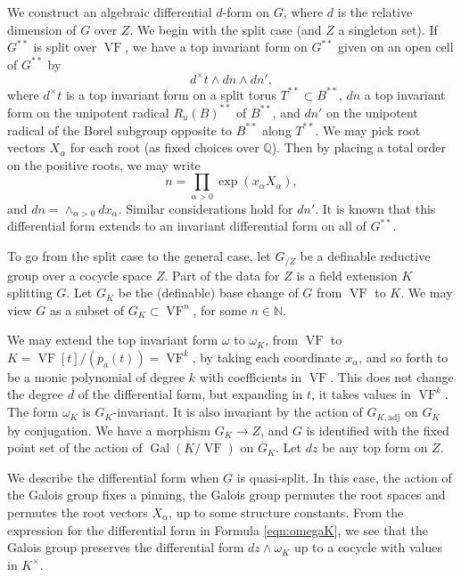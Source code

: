 \documentclass[12pt]{amsart}
\newcommand{\op}[1]{\operatorname{#1}}
\newcommand{\ring}[1]{{\mathbb #1}}
\def\VF{{\op{VF}}}
\theoremstyle{plain}
\theoremstyle{definition}
\begin{document}
We construct an algebraic differential $d$-form on $G$, where $d$ is
the relative dimension of $G$ over $Z$.  We begin with the split case
(and $Z$ a singleton set).  If $G^{**}$ is split over $\op{VF}$, we
have a top invariant form on $G^{**}$ given on an open cell of
$G^{**}$ by
\begin{equation}\label{eqn:omegaK}
d^\times t\land dn\land dn',
\end{equation}
where $d^\times t$ is a top invariant form on a split torus $T^{**} \subset
B^{**}$, $dn$ a top invariant form on the unipotent radical
$R_u(B)^{**}$ of $B^{**}$, and $dn'$ on the unipotent radical of the
Borel subgroup opposite to $B^{**}$ along $T^{**}$.  We may pick root
vectors $X_\alpha$ for each root (as fixed choices over $\ring{Q}$).
Then by placing a total order on the positive roots, we may write
\[
n = \prod_{\alpha>0}\exp(x_\alpha X_\alpha),
\]
and $dn = \land_{\alpha>0} dx_\alpha$.  Similar considerations hold
for $dn'$.  It is known that this differential form extends to an
invariant differential form on all of $G^{**}$.

To go from the split case to the general case, 
let $G_{/Z}$ be a definable reductive group over a cocycle space $Z$.
Part of the data
for $Z$ is a field extension $K$ splitting $G$.  Let $G_K$
be the (definable) base change of $G$ from $\VF$ to $K$. We may view
$G$ as a subset of $G_K\subset \VF^{n}$, for some
$n\in\ring{N}$.

We may extend the top invariant form $\omega$ to $\omega_K$, from
$\VF$ to $K = \VF[t]/(p_a(t)) = \VF^k$, by taking each coordinate
$x_\alpha$, and so forth to be a monic polynomial of degree $k$ with
coefficients in $\VF$.  This does not change the degree $d$ of the
differential form, but expanding in $t$, it takes values in $\VF^k$.
The form $\omega_K$ is $G_K$-invariant.  It is also invariant by the
action of $G_{K,\text{adj}}$ on $G_K$ by conjugation.  We have a
morphism $G_K\to Z$, and $G$ is identified with the fixed point set of
the action of $\op{Gal}(K/\VF)$ on $G_K$.  Let $dz$ be any top form on
$Z$.

We describe the differential form when $G$ is quasi-split.  In this
case, the action of the Galois group fixes a pinning, the Galois group
permutes the root spaces and permutes the root vectors $X_\alpha$, up
to some structure constants.  From the expression for the differential
form in Formula \ref{eqn:omegaK}, we see that the Galois group
preserves the differential form $dz\land \omega_K$ up to a cocycle
with values in $K^\times$.
\end{document}
